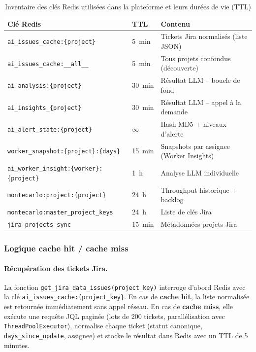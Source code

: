 \begin{table}[H]
\centering
\renewcommand{\arraystretch}{1.3}
\begin{tabular}{p{5.2cm}p{2.2cm}p{5cm}}
\hline
\textbf{Clé Redis} & \textbf{TTL} & \textbf{Contenu} \\
\hline
\texttt{ai\_issues\_cache:\{project\}} & 5~min & Tickets Jira normalisés (liste JSON) \\
\texttt{ai\_issues\_cache:\_\_all\_\_} & 5~min & Tous projets confondus (découverte) \\
\texttt{ai\_analysis:\{project\}} & 30~min & Résultat LLM – boucle de fond \\
\texttt{ai\_insights\_\{project\}} & 30~min & Résultat LLM – appel à la demande \\
\texttt{ai\_alert\_state:\{project\}} & $\infty$ & Hash MD5 + niveaux d’alerte \\
\texttt{worker\_snapshot:\{project\}:\{days\}} & 15~min & Snapshots par assignee (Worker Insights) \\
\texttt{ai\_worker\_insight:\{worker\}:\{project\}} & 1~h & Analyse LLM individuelle \\
\texttt{montecarlo:project:\{project\}} & 24~h & Throughput historique + backlog \\
\texttt{montecarlo:master\_project\_keys} & 24~h & Liste de clés Jira \\
\texttt{jira\_projects\_sync} & 15~min & Métadonnées projets Jira \\
\hline
\end{tabular}
\caption{Inventaire des clés Redis utilisées dans la plateforme et leurs durées de vie (TTL)}
\label{tab:redis-keys}
\end{table}

\subsubsection*{Logique cache hit / cache miss}

\paragraph{Récupération des tickets Jira.}
La fonction \texttt{get\_jira\_data\_issues(project\_key)} interroge d’abord Redis avec la clé \texttt{ai\_issues\_cache:\{project\_key\}}.
En cas de \textbf{cache hit}, la liste normalisée est retournée immédiatement sans appel réseau. En cas de \textbf{cache miss}, elle exécute une requête JQL paginée (lots de 200 tickets, parallélisation avec \texttt{ThreadPoolExecutor}), normalise chaque ticket (statut canonique, \texttt{days\_since\_update}, assignee) et stocke le résultat dans Redis avec un TTL de 5 minutes.

